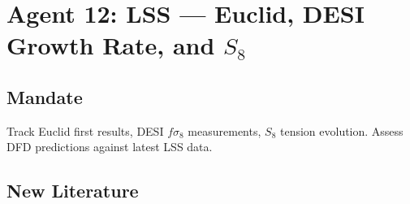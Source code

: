 \documentclass[11pt,a4paper]{article}
\begin{document}
\section{Agent 12: LSS --- Euclid, DESI Growth Rate, and $S_8$}

\subsection{Mandate}
Track Euclid first results, DESI $f\sigma_8$ measurements, $S_8$ tension evolution. Assess DFD predictions against latest LSS data.

\subsection{New Literature}
\end{document}
